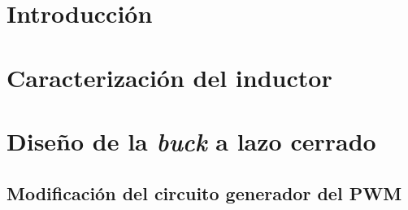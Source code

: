 \documentclass[a4paper,12pt]{article}
\begin{document}
\vspace{2em}
\thispagestyle{empty}

\begin{abstract}
En este informe se presenta el diseño, implementación y validación experimental de una fuente conmutada tipo \textit{buck} a lazo cerrado, desarrollada como etapa final del proyecto integrador. Se aborda la caracterización del inductor, el ajuste del generador PWM, la selección de componentes de la etapa de potencia, la implementación del \textit{gate driver}, el diseño de la red de compensación y la fabricación del PCB. También se incluyen simulaciones de estabilidad y mediciones sobre el prototipo final, junto con la integración de la etapa reguladora LDO. Los resultados obtenidos verifican un funcionamiento estable de la fuente, con buena regulación de línea y de carga, eficiencias superiores al $90\%$ para $V_{in}=12\,$V en el rango ensayado y un desempeño adecuado frente a variaciones de entrada y carga. A partir de la comparación entre el modelo teórico, las simulaciones y las mediciones experimentales, se identificaron y corrigieron diferencias propias de la implementación práctica, obteniéndose finalmente una fuente funcional, eficiente y experimentalmente validada.
\end{abstract}

\newpage
\tableofcontents
\newpage

\section{Introducción}


\section{Caracterización del inductor}


\section{Diseño de la \textit{buck} a lazo cerrado}
\subsection{Modificación del circuito generador del PWM}

\end{document}
